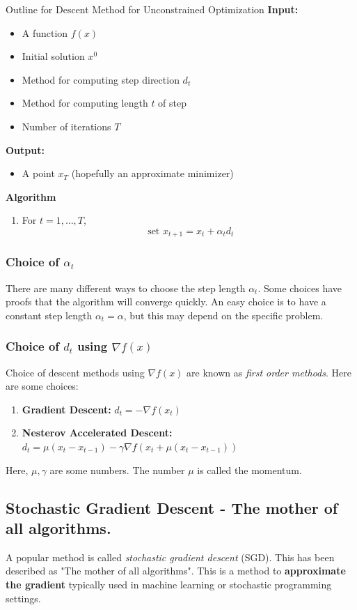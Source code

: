 \begin{general}{Outline for Descent Method for Unconstrained Optimization}{}
\textbf{Input:} 
\begin{itemize}
\item A function $f(x)$
\item Initial solution $x^0$
\item Method for computing step direction $d_t$
\item Method for computing length $t$ of step
\item Number of iterations $T$
\end{itemize}

\textbf{Output:}
\begin{itemize}
\item A point $x_{T}$ (hopefully an approximate minimizer)
\end{itemize}

\textbf{Algorithm}
\begin{enumerate}
\item For $t=1, \dots, T$,
$$
\text{ set } x_{t+1} = x_t + \alpha_t d_t 
$$
\end{enumerate}

\end{general}
\subsubsection{Choice of $\alpha_t$}
There are many different ways to choose the step length $\alpha_t$.  Some choices have proofs that the algorithm will converge quickly.  An easy choice is to have a constant step length $\alpha_t = \alpha$, but this may depend on the specific problem.

\subsubsection{Choice of $d_t$ using $\nabla f(x)$}
Choice of descent methods using $\nabla f(x)$ are known as \emph{first order methods}.
Here are some choices:
\begin{enumerate}
\item \textbf{Gradient Descent:}   $d_t = - \nabla f(x_t)$
\item \textbf{Nesterov Accelerated Descent:} $d_t = \mu (x_t - x_{t-1}) - \gamma \nabla f(x_t + \mu(x_t- x_{t-1}))$
\end{enumerate}
Here, $\mu, \gamma$ are some numbers.  The number $\mu$ is called the momentum.  

\subsection{Stochastic Gradient Descent - The mother of all algorithms.}
 A popular method is called \emph{stochastic gradient descent} (SGD).   This has been described as "The mother of all algorithms".  
 This is a method to \textbf{approximate the gradient} typically used in machine learning or stochastic programming settings.  
 
